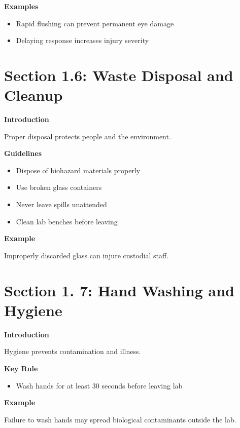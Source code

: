 \documentclass[
  letterpaper,
  DIV=11,
  numbers=noendperiod]{scrreprt}
\providecommand{\tightlist}{%
  \setlength{\itemsep}{0pt}\setlength{\parskip}{0pt}}
\begin{document}
\textbf{Examples}

\begin{itemize}
\item
  Rapid flushing can prevent permanent eye damage
\item
  Delaying response increases injury severity
\end{itemize}

\section{\texorpdfstring{\textbf{Section 1.6: Waste Disposal and
Cleanup}}{Section 1.6: Waste Disposal and Cleanup}}\label{section-1.6-waste-disposal-and-cleanup}

\textbf{Introduction}

Proper disposal protects people and the environment.

\textbf{Guidelines}

\begin{itemize}
\item
  Dispose of biohazard materials properly
\item
  Use broken glass containers
\item
  Never leave spills unattended
\item
  Clean lab benches before leaving
\end{itemize}

\textbf{Example}

Improperly discarded glass can injure custodial staff.

\section{\texorpdfstring{\textbf{Section 1. 7: Hand Washing and
Hygiene}}{Section 1. 7: Hand Washing and Hygiene}}\label{section-1.-7-hand-washing-and-hygiene}

\textbf{Introduction}

Hygiene prevents contamination and illness.

\textbf{Key Rule}

\begin{itemize}
\tightlist
\item
  Wash hands for at least 30 seconds before leaving lab
\end{itemize}

\textbf{Example}

Failure to wash hands may spread biological contaminants outside the
lab.
\end{document}
